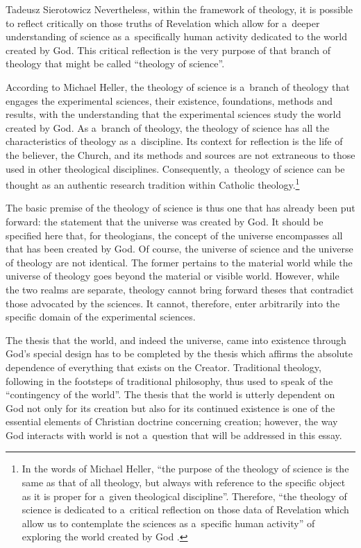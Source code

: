 \begin{artengenv}{Tadeusz Sierotowicz}
Nevertheless, within the framework of theology, it is possible to reflect critically on those truths of Revelation which allow for a~deeper understanding of science as a~specifically human activity dedicated to the world created by God. This critical reflection is the very purpose of that branch of theology that might be called ``theology of science''.



According to Michael Heller, the theology of science is a~branch of theology that engages the experimental sciences, their existence, foundations, methods and results, with the understanding that the experimental sciences study the world created by God. As a~branch of theology, the theology of science has all the characteristics of theology as a~discipline. Its context for reflection is the life of the believer, the Church, and its methods and sources are not extraneous to those used in other theological disciplines. Consequently, a~theology of science can be thought as an authentic research tradition within Catholic theology.\footnote{In the words of Michael Heller, ``the purpose of the theology of science is the same as that of all theology, but always with reference to the specific object as it is proper for a~given theological discipline''. Therefore, ``the theology of science is dedicated to a~critical reflection on those data of Revelation which allow us to contemplate the sciences as a~specific human activity'' of exploring the world created by God 
\parencite[][pp.97 and 99]{heller_new_1996}.%
}



The basic premise of the theology of science is thus one that has already been put forward: the statement that the universe was created by God. It should be specified here that, for theologians, the concept of the universe encompasses all that has been created by God. Of course, the universe of science and the universe of theology are not identical. The former pertains to the material world while the universe of theology goes beyond the material or visible world. However, while the two realms are separate, theology cannot bring forward theses that contradict those advocated by the sciences. It cannot, therefore, enter arbitrarily into the specific domain of the experimental sciences.



The thesis that the world, and indeed the universe, came into existence through God's special design has to be completed by the thesis which affirms the absolute dependence of everything that exists on the Creator. Traditional theology, following in the footsteps of traditional philosophy, thus used to speak of the ``contingency of the world''. The thesis that the world is utterly dependent on God not only for its creation but also for its continued existence is one of the essential elements of Christian doctrine concerning creation; however, the way God interacts with world is not a~question that will be addressed in this essay.




\end{artengenv}
